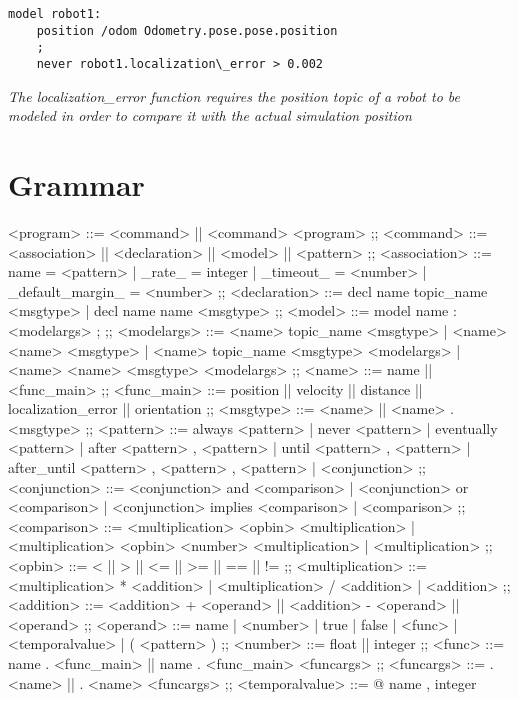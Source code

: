 \begin{lstlisting}
model robot1:
    position /odom Odometry.pose.pose.position
    ;
    never robot1.localization\_error > 0.002
\end{lstlisting}

\textit{The localization\_error function requires the position topic of a robot to be modeled in order to compare it with the actual simulation position}

\section{Grammar}
\label{sec:grammar}


\begin{bnfgrammar}
    <program> %
    ::=
    <command> || <command> <program>
    ;;
    <command> ::=
    <association>
    || <declaration>
    || <model>
    || <pattern>
    ;; 
    <association> ::=
    name = <pattern>
    | \_rate\_ = integer
    | \_timeout\_ = <number>
    | \_default\_margin\_ = <number>
    ;;
    <declaration> ::=
    decl name topic\_name <msgtype>
    | decl name name <msgtype>
    ;;
    <model> ::= 
    model name $\colon$ <modelargs> ;
    ;;
    <modelargs> ::= 
    <name> topic\_name <msgtype>
    | <name> <name> <msgtype>
    | <name> topic\_name <msgtype> <modelargs>
    | <name> <name> <msgtype> <modelargs>
    ;;
    <name> ::= 
    name || <func\_main>
    ;;
    <func\_main> ::= 
    position
    || velocity
    || distance
    || localization\_error
    || orientation
    ;;
    <msgtype> ::= 
    <name> || <name> . <msgtype>
    ;;
    <pattern> ::= 
    always <pattern>
    | never <pattern>
    | eventually <pattern>
    | after <pattern> , <pattern>
    | until <pattern> , <pattern>
    | after\_until <pattern> , <pattern> , <pattern>
    | <conjunction>
    ;;
    <conjunction> ::= 
    <conjunction> and <comparison>
    | <conjunction> or <comparison>
    | <conjunction> implies <comparison>
    | <comparison>
    ;;
    <comparison> ::= 
    <multiplication> <opbin> <multiplication>
    | <multiplication> <opbin> { <number> } <multiplication>
    | <multiplication>
    ;;
    <opbin> ::= 
    < || > || <= || >= || == || !=
    ;;
    <multiplication> ::= 
    <multiplication> * <addition>
    | <multiplication> / <addition>
    | <addition>
    ;;
    <addition> ::= <addition> + <operand>
    || <addition> - <operand>
    || <operand>
    ;;
    <operand> ::= 
    name | <number> | true | false | <func> | <temporalvalue> | ( <pattern> )
    ;;
    <number> ::= 
    float || integer
    ;;
    <func> ::= 
    name . <func\_main>
    || name . <func\_main> <funcargs>
    ;;
    <funcargs> ::= 
    . <name> || . <name> <funcargs>
    ;;
    <temporalvalue> ::= 
    @ { name , integer }
\end{bnfgrammar}


